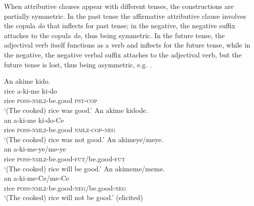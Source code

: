 \documentclass[output=paper,colorlinks,citecolor=brown]{langscibook}
\begin{document}
When attributive clauses appear with different tenses, the constructions are partially symmetric. In the past tense the affirmative attributive clause involves the copula \textit{do} that inflects for past tense; in the negative, the negative suffix attaches to the copula \textit{do,} thus being symmetric. In the future tense, the adjectival verb itself functions as a verb and inflects for the future tense, while in the negative, the negative verbal suffix attaches to the adjectival verb, but the future tense is lost, thus being asymmetric, e.g. .

\ea\label{ex:amr:21}
    \ea\label{ex:amr:21a}An akime kido.  \\ 
        \gll rice a-ki-me ki-do \\
               rice \textsc{poss}{}-\textsc{nmlz}{}-be.good \textsc{pst}{}-\textsc{cop} \\
        \glt ‘(The cooked) rice was good.’ 
    \ex\label{ex:amr:21b}An akime kidode. \\
        \gll an a-ki-me ki-do-Ce\\
              rice \textsc{poss}{}-\textsc{nmlz}{}-be.good \textsc{nmlz}{}-\textsc{cop}{}-\textsc{neg}\\
        \glt ‘(The cooked) rice was not good.’
    \ex\label{ex:amr:21c}An akimeye/meye.  \\ 
        \gll an a-ki-me-ye/me-ye \\
              rice \textsc{poss}{}-\textsc{nmlz}{}-be.good-\textsc{fut}/be.good-\textsc{fut} \\
        \glt ‘(The cooked) rice will be good.’ 
    \ex\label{ex:amr:21d}An akimeme/meme. \\
        \gll an a-ki-me-Ce/me-Ce\\
              rice \textsc{poss}{}-\textsc{nmlz}{}-be.good-\textsc{neg}/be.good-\textsc{neg}\\
        \glt ‘(The cooked) rice will not be good.’ (elicited)
    \z
\z 
\end{document}

